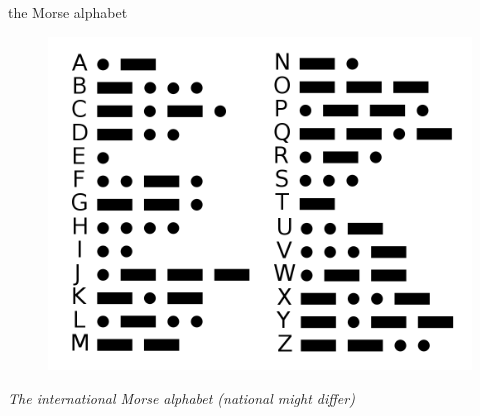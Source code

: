 \begin{frame}{the Morse alphabet}

  \begin{figure}
    \center
    \includegraphics[scale=0.2]{code.png}

  \end{figure}

  \vspace{10pt}\pause  
  {\em The international Morse alphabet (national might differ)}

\end{frame}

